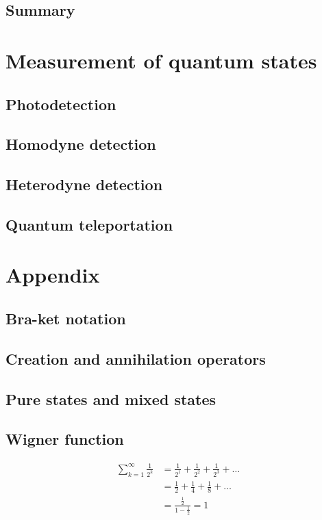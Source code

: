 \documentclass{book}
\begin{document}
\section{Summary}

\chapter{Measurement of quantum states}
\section{Photodetection}
\section{Homodyne detection}
\section{Heterodyne detection}

\section{Quantum teleportation}

\appendix
\chapter{Appendix}
\section{Bra-ket notation}
\section{Creation and annihilation operators}
\section{Pure states and mixed states}
\section{Wigner function}

\begin{equation}
\begin{aligned}
  \sum_{k=1}^\infty \frac 1 {2^k} &= \frac 1 {2^1} + \frac 1 {2^2} + \frac 1 {2^3} + \dots \\
  &= \frac{1}{2} + \frac{1}{4} + \frac{1}{8} + \dots \\
  &= \frac{\frac 1 2}{1-\frac 1 2} =  1
\end{aligned}
\end{equation}
\end{document}
